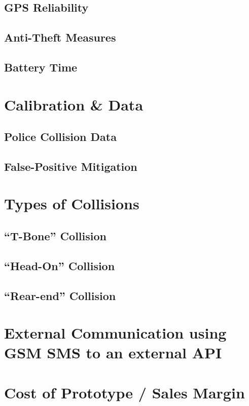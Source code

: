 \documentclass[titlepage]{article}
\begin{document}
\subsection{GPS Reliability}
\lipsum[1]
\subsection{Anti-Theft Measures}
\lipsum[1]
\subsection{Battery Time}
\lipsum[1]

\section{Calibration \& Data}
\lipsum[1]
\subsection{Police Collision Data}
\lipsum[1]
\subsection{False-Positive Mitigation}
\lipsum[1]

\section{Types of Collisions}
\lipsum[1]
\subsection{``T-Bone'' Collision}
\lipsum[1]
\subsection{``Head-On'' Collision}
\lipsum[1]
\subsection{``Rear-end'' Collision}
\lipsum[1]

\section[External Communication]{External Communication using GSM SMS to an external API}
\lipsum

\section{Cost of Prototype / Sales Margin}
\lipsum
\end{document}
